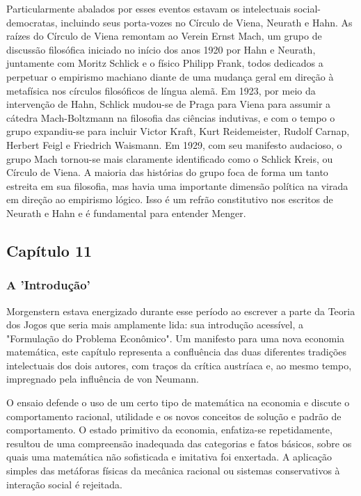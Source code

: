 \documentclass[a4paper,12pt]{article}[abntex2]
\begin{document}
Particularmente abalados por esses eventos estavam os intelectuais social-democratas, incluindo seus porta-vozes no Círculo de Viena, Neurath e Hahn. As raízes do Círculo de Viena remontam ao Verein Ernst Mach, um grupo de discussão filosófica iniciado no início dos anos 1920 por Hahn e Neurath, juntamente com Moritz Schlick e o físico Philipp Frank, todos dedicados a perpetuar o empirismo machiano diante de uma mudança geral em direção à metafísica nos círculos filosóficos de língua alemã. Em 1923, por meio da intervenção de Hahn, Schlick mudou-se de Praga para Viena para assumir a cátedra Mach-Boltzmann na filosofia das ciências indutivas, e com o tempo o grupo expandiu-se para incluir Victor Kraft, Kurt Reidemeister, Rudolf Carnap, Herbert Feigl e Friedrich Waismann. Em 1929, com seu manifesto audacioso, o grupo Mach tornou-se mais claramente identificado como o Schlick Kreis, ou Círculo de Viena. A maioria das histórias do grupo foca de forma um tanto estreita em sua filosofia, mas havia uma importante dimensão política na virada em direção ao empirismo lógico. Isso é um refrão constitutivo nos escritos de Neurath e Hahn e é fundamental para entender Menger.

\subsection{\textbf{Capítulo 11}}
\subsubsection{\textbf{A 'Introdução'}}

Morgenstern estava energizado durante esse período ao escrever a parte da Teoria dos Jogos que seria mais amplamente lida: sua introdução acessível, a "Formulação do Problema Econômico". Um manifesto para uma nova economia matemática, este capítulo representa a confluência das duas diferentes tradições intelectuais dos dois autores, com traços da crítica austríaca e, ao mesmo tempo, impregnado pela influência de von Neumann.

O ensaio defende o uso de um certo tipo de matemática na economia e discute o comportamento racional, utilidade e os novos conceitos de solução e padrão de comportamento. O estado primitivo da economia, enfatiza-se repetidamente, resultou de uma compreensão inadequada das categorias e fatos básicos, sobre os quais uma matemática não sofisticada e imitativa foi enxertada. A aplicação simples das metáforas físicas da mecânica racional ou sistemas conservativos à interação social é rejeitada.
\end{document}
